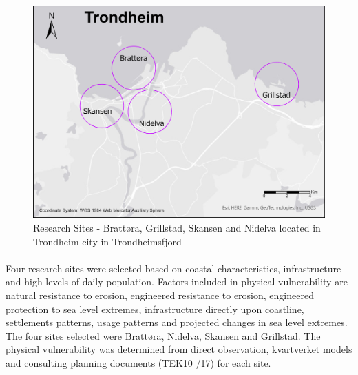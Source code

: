 \begin{figure} [h]
    \centering
    \includegraphics[width=1.0\textwidth]{fig/trondheim_research_sites_grey_circles.png}
    \caption{ Research Sites - Brattøra, Grillstad, Skansen and Nidelva located in Trondheim city in Trondheimsfjord}
    \label{fig:research sites}
\end{figure}




\paragraph{}

Four research sites were selected based on coastal characteristics, infrastructure and high levels of daily population. Factors included in physical vulnerability are natural resistance to erosion, engineered resistance to erosion, engineered protection to sea level extremes, infrastructure directly upon coastline, settlements patterns, usage patterns and projected changes in sea level extremes. The four sites selected were Brattøra, Nidelva, Skansen and Grillstad. The physical vulnerability was determined from direct observation, kvartverket models and consulting planning documents (TEK10 /17) for each site. \cite{miljoenheten_og_byplankontoret_trondheim_kommune_9-notat-om-havnivastigning-og-stormflo---hensyn-i-arealplanlegging-nyhavnapdf_2020}


